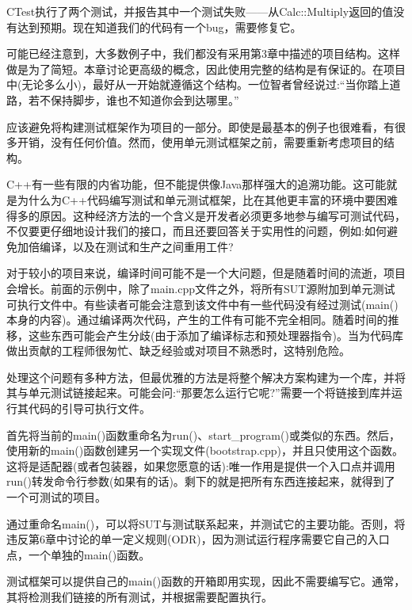 CTest执行了两个测试，并报告其中一个测试失败——从Calc::Multiply返回的值没有达到预期。现在知道我们的代码有一个bug，需要修复它。

\begin{tcolorbox}[colback=blue!5!white,colframe=blue!75!black,title=Note]
可能已经注意到，大多数例子中，我们都没有采用第3章中描述的项目结构。这样做是为了简短。本章讨论更高级的概念，因此使用完整的结构是有保证的。在项目中(无论多么小)，最好从一开始就遵循这个结构。一位智者曾经说过:“当你踏上道路，若不保持脚步，谁也不知道你会到达哪里。”
\end{tcolorbox}

应该避免将构建测试框架作为项目的一部分。即使是最基本的例子也很难看，有很多开销，没有任何价值。然而，使用单元测试框架之前，需要重新考虑项目的结构。


C++有一些有限的内省功能，但不能提供像Java那样强大的追溯功能。这可能就是为什么为C++代码编写测试和单元测试框架，比在其他更丰富的环境中要困难得多的原因。这种经济方法的一个含义是开发者必须更多地参与编写可测试代码，不仅要更仔细地设计我们的接口，而且还要回答关于实用性的问题，例如:如何避免加倍编译，以及在测试和生产之间重用工件?

对于较小的项目来说，编译时间可能不是一个大问题，但是随着时间的流逝，项目会增长。前面的示例中，除了main.cpp文件之外，将所有SUT源附加到单元测试可执行文件中。有些读者可能会注意到该文件中有一些代码没有经过测试(main()本身的内容)。通过编译两次代码，产生的工件有可能不完全相同。随着时间的推移，这些东西可能会产生分歧(由于添加了编译标志和预处理器指令)。当为代码库做出贡献的工程师很匆忙、缺乏经验或对项目不熟悉时，这特别危险。

处理这个问题有多种方法，但最优雅的方法是将整个解决方案构建为一个库，并将其与单元测试链接起来。可能会问:“那要怎么运行它呢?”需要一个将链接到库并运行其代码的引导可执行文件。

首先将当前的main()函数重命名为run()、start\_program()或类似的东西。然后，使用新的main()函数创建另一个实现文件(bootstrap.cpp)，并且只使用这个函数。这将是适配器(或者包装器，如果您愿意的话):唯一作用是提供一个入口点并调用run()转发命令行参数(如果有的话)。剩下的就是把所有东西连接起来，就得到了一个可测试的项目。

通过重命名main()，可以将SUT与测试联系起来，并测试它的主要功能。否则，将违反第6章中讨论的单一定义规则(ODR)，因为测试运行程序需要它自己的入口点，一个单独的main()函数。

测试框架可以提供自己的main()函数的开箱即用实现，因此不需要编写它。通常，其将检测我们链接的所有测试，并根据需要配置执行。

